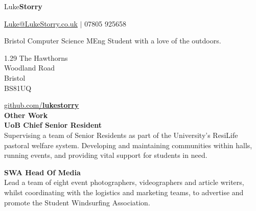 \documentclass[10pt]{article}
\newcommand{\bold}[1]{\textbf{\textcolor{dark}{#1}}}
\newcommand{\sect}[1]{{\LARGE\bold{#1}}\vspace{0.2em}\\}
\newcommand{\xx}[2]{{\large\bold{#1}}\\{#2}\vspace{0.5em}}
\begin{document}
\begin{center}
{\color{dark}\Huge Luke\textbf{Storry}}
\hspace{0.1em}

{\large \href{mailto:Luke@LukeStorry.co.uk}{Luke@LukeStorry.co.uk}  $|$  07805 925658} 

Bristol Computer Science MEng Student with a love of the outdoors.\\
\vspace{-0.5em}
{\color{dark}\hrulefill}
\end{center}





\begin{minipage}[t]{0.33\textwidth}
\raggedright

1.29  The Hawthorns\\Woodland Road\\Bristol\\BS81UQ

\vspace{0.5em}
\href{https://github.com/lukestorry}{github.com/\bold{\textcolor{dark}{lukestorry}}} \\

\vspace{0.5em}
\sect{Other Work}
\xx{UoB Chief Senior Resident}
{Supervising a team of Senior Residents as part of the University's ResiLife pastoral welfare system. Developing and maintaining communities within halls, running events, and providing vital support for students in need.
}

\xx{SWA Head Of Media}
{Lead a team of eight event photographers, videographers and article writers, whilst coordinating with the logistics and marketing teams, to advertise and promote the Student Windsurfing Association.
}


\end{minipage}
\end{document}
